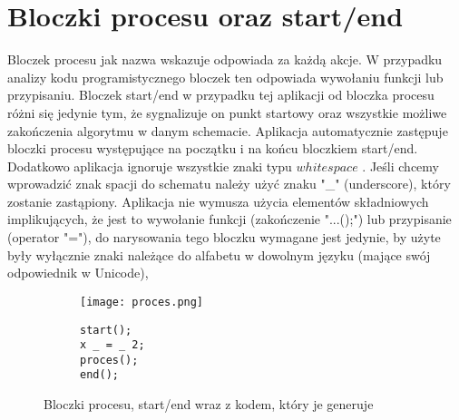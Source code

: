\section{Bloczki procesu oraz start/end}
	Bloczek procesu jak nazwa wskazuje odpowiada za każdą akcje. W przypadku analizy kodu programistycznego bloczek ten odpowiada wywołaniu funkcji lub przypisaniu. Bloczek start/end w przypadku tej aplikacji od bloczka procesu różni się jedynie tym, że sygnalizuje on punkt startowy oraz wszystkie możliwe zakończenia algorytmu w danym schemacie. Aplikacja automatycznie zastępuje bloczki procesu występujące na początku i na końcu bloczkiem start/end. Dodatkowo aplikacja ignoruje wszystkie znaki typu $whitespace$ . Jeśli chcemy wprowadzić znak spacji do schematu należy użyć znaku "\_" (underscore), który zostanie zastąpiony. Aplikacja nie wymusza użycia elementów składniowych implikujących, że jest to wywołanie funkcji (zakończenie "...();") lub przypisanie (operator "="), do narysowania tego bloczku wymagane jest jedynie, by użyte były wyłącznie znaki należące do alfabetu w dowolnym języku (mające swój odpowiednik w Unicode),  
	
	\begin{figure}[H]
  \begin{subfigure}[t]{0.49\textwidth}
    \vspace{0pt}
    \texttt{[image: proces.png]}
  \end{subfigure}\hfill
  \begin{subfigure}[t]{0.49\textwidth}
    \begin{verbatim}
start();
x _ = _ 2;
proces();
end();
    \end{verbatim}
  \end{subfigure}%
  \caption{Bloczki procesu, start/end wraz z kodem, który je generuje}
\end{figure}

